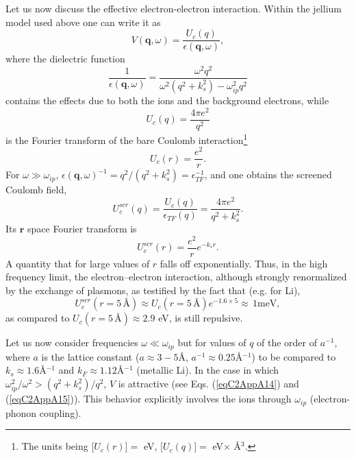 Let us now discuss the effective electron-electron interaction. Within the jellium model used above one can write it as
\begin{equation}\label{eqC2AppA14}
V(\mathbf q,\omega)=\frac{U_c(q)}{\epsilon(\mathbf q,\omega)},
\end{equation}
where the dielectric function
\begin{equation}\label{eqC2AppA15}
\frac{1}{\epsilon(\mathbf q,\omega)}=\frac{\omega^2q^2}{\omega^2(q^2+k_s^2)-\omega^2_{ip}q^2}
\end{equation}
contains the effects due to both the ions and the background electrons, while
\begin{equation}\label{eqC2AppA16}
U_c(q)=\frac{4\pi e^2}{q^2}
\end{equation}
is the Fourier transform of the bare Coulomb interaction\footnote{The units being [$U_c(r)]=$ eV, [$U_c(q)]=$ eV$\times$ \AA$^3$.}
\begin{equation}\label{eqC2AppA17}
U_c(r)=\frac{e^2}{r}.
\end{equation}
For $\omega\gg \omega_{ip}$, $\epsilon(\mathbf q,\omega)^{-1}=q^2/(q^2+k_s^2)=\epsilon_{TF}^{-1}$, and  one obtains the  screened Coulomb field,
\begin{equation}\label{eqC2AppA18}
U_c^{scr}(q)=\frac{U_c(q)}{\epsilon_{TF}(q)}=\frac{4\pi e^2}{q^2+k_s^2}.
\end{equation}
Its $\mathbf r$ space Fourier transform is 
\begin{equation}\label{eqC2AppA19}
U_c^{scr}(r)=\frac{e^2}{r}e^{-k_s r}.
\end{equation}
A quantity that for large values of $r$ falls off exponentially. Thus, in the high frequency limit, the electron--electron interaction, although strongly renormalized by the exchange of plasmons, as testified by the fact that (e.g. for Li),
\begin{equation}\label{eqC2AppA20}
U_c^{scr}(r=5\,\text{\AA})\approx U_c(r=5\,\text{\AA})e^{-1.6\times 5}\approx \,1\text{meV},
\end{equation}
as compared to $U_c(r=5\,\text{\AA})\approx 2.9$ eV, is still repulsive.


Let us now consider frequencies $\omega\ll \omega_{ip}$ but for values of $q$ of the order of $a^{-1}$, where $a$ is the lattice constant ($a\approx 3-5$\AA, $a^{-1}\approx 0.25$\AA$^{-1}$) to be compared to $k_s\approx 1.6 $\AA$^{-1}$ and $k_F\approx 1.12$\AA$^{-1}$ (metallic Li). In the case in which $\omega_{ip}^2/\omega^2>(q^2+k_s^2)/q^2$, $V$ is attractive (see Eqs. (\ref{eqC2AppA14}) and (\ref{eqC2AppA15})).  This behavior explicitly involves the ions through $\omega_{ip}$ (electron-phonon coupling). 


